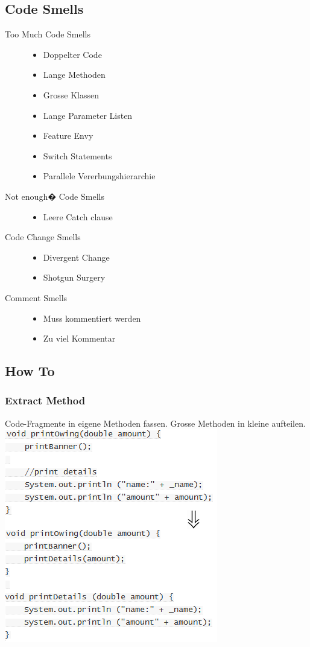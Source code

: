 \documentclass[a4paper,10pt]{article}
\begin{document}
\subsection{Code Smells}
\begin{description}
	\item[Too Much Code Smells] \hfill
		\begin{itemize}
			\item Doppelter Code
			\item Lange Methoden
			\item Grosse Klassen
			\item Lange Parameter Listen
			\item Feature Envy
			\item Switch Statements
			\item Parallele Vererbungshierarchie
		\end{itemize}
	\item[Not enough� Code Smells] \hfill 
		\begin{itemize}
			\item Leere Catch clause
		\end{itemize}
	\item[Code Change Smells] \hfill
		\begin{itemize}
			\item Divergent Change
			\item Shotgun Surgery	
		\end{itemize}
	\item[Comment Smells] \hfill 
		\begin{itemize}
			\item Muss kommentiert werden
			\item Zu viel Kommentar
		\end{itemize}
\end{description}

\subsection{How To}
\subsubsection{Extract Method}
Code-Fragmente in eigene Methoden fassen. Grosse Methoden in kleine aufteilen.\\
\includegraphics[scale=.6]{refactoring_1.png}
\end{document}
